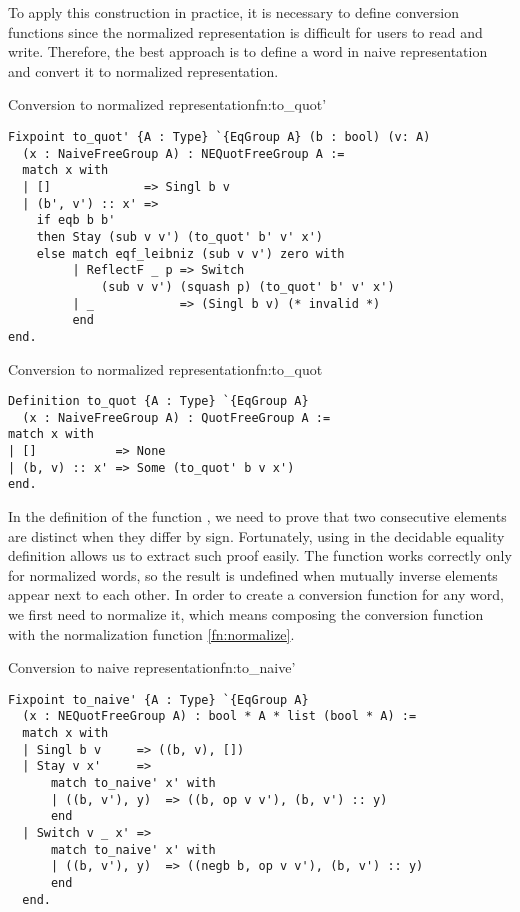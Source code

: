 To apply this construction in practice, it is necessary to define conversion functions since the normalized representation is difficult for users to read and write. Therefore, the best approach is to define a word in naive representation and convert it to normalized representation.
\begin{func}{Conversion to normalized representation}{fn:to_quot'}
\begin{verbatim}
Fixpoint to_quot' {A : Type} `{EqGroup A} (b : bool) (v: A) 
  (x : NaiveFreeGroup A) : NEQuotFreeGroup A :=
  match x with 
  | []             => Singl b v
  | (b', v') :: x' => 
    if eqb b b' 
    then Stay (sub v v') (to_quot' b' v' x')
    else match eqf_leibniz (sub v v') zero with
         | ReflectF _ p => Switch 
             (sub v v') (squash p) (to_quot' b' v' x')
         | _            => (Singl b v) (* invalid *)
         end
end.
\end{verbatim}
\end{func}
\begin{func}{Conversion to normalized representation}{fn:to_quot}
\begin{verbatim}
Definition to_quot {A : Type} `{EqGroup A} 
  (x : NaiveFreeGroup A) : QuotFreeGroup A :=
match x with
| []           => None
| (b, v) :: x' => Some (to_quot' b v x')
end.
\end{verbatim}
\end{func}
In the definition of the function , we need to prove that two consecutive elements are distinct when they differ by sign. Fortunately, using  in the decidable equality definition allows us to extract such proof easily. The  function works correctly only for normalized words, so the result is undefined when mutually inverse elements appear next to each other. In order to create a conversion function for any word, we first need to normalize it, which means composing the conversion function with the normalization function \ref{fn:normalize}.
\begin{func}{Conversion to naive representation}{fn:to_naive'}
\begin{verbatim}
Fixpoint to_naive' {A : Type} `{EqGroup A} 
  (x : NEQuotFreeGroup A) : bool * A * list (bool * A) :=
  match x with 
  | Singl b v     => ((b, v), [])
  | Stay v x'     => 
      match to_naive' x' with
      | ((b, v'), y)  => ((b, op v v'), (b, v') :: y)
      end
  | Switch v _ x' => 
      match to_naive' x' with
      | ((b, v'), y)  => ((negb b, op v v'), (b, v') :: y)
      end
  end.
\end{verbatim}
\end{func}
